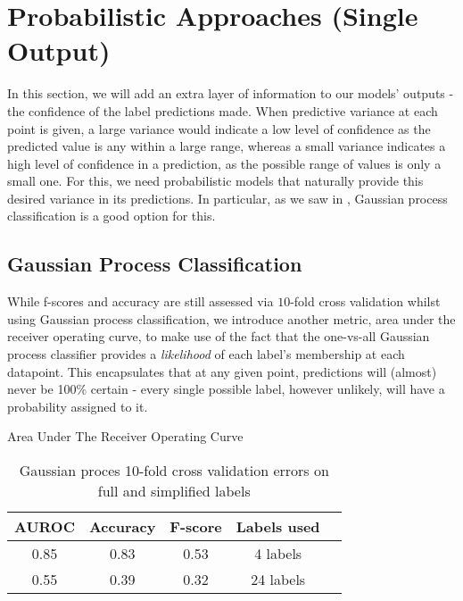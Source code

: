 \section{Probabilistic Approaches (Single Output)}

In this section, we will add an extra layer of information to our models' outputs - the confidence of the label predictions made. When predictive variance at each point is given, a large variance would indicate a low level of confidence as the predicted value is any within a large range, whereas a small variance indicates a high level of confidence in a prediction, as the possible range of values is only a small one. For this, we need probabilistic models that naturally provide this desired variance in its predictions. In particular, as we saw in , Gaussian process classification is a good option for this.

\subsection{Gaussian Process Classification}

While f-scores and accuracy are still assessed via $10$-fold cross validation whilst using Gaussian process classification, we introduce another metric, area under the receiver operating curve, to make use of the fact that the one-vs-all Gaussian process classifier provides a \textit{likelihood} of each label's membership at each datapoint. This encapsulates that at any given point, predictions will (almost) never be 100\% certain - every single possible label, however unlikely, will have a probability assigned to it. 

Area Under The Receiver Operating Curve

\begin{table}[H]
    \centering
\begin{tabular}{|c|c|c|c|c|}
    \hline
    AUROC & Accuracy & F-score & Labels used\\\hline
    0.85 & 0.83 & 0.53 & 4 labels \\
    0.55 & 0.39 & 0.32 & 24 labels \\
    \hline
\end{tabular}
    \caption{Gaussian proces 10-fold cross validation errors on full and simplified labels}
    \label{table:gperrs}
\end{table}

